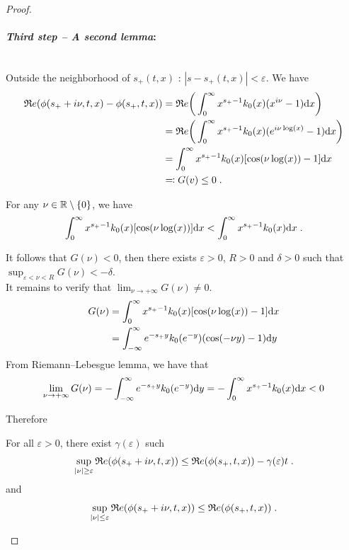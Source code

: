 \documentclass[11pt]{amsart}
\renewcommand{\Re}{\mathfrak{R}e}
\begin{document}
\begin{proof}
\medskip
\paragraph{\textit{Third step -- A second lemma}:}\mbox{}\\
Outside the neighborhood of $s_+(t,x)$ : $|s - s_+(t,x)| < \varepsilon$. We have
\begin{align*}
    \Re(\phi(s_+ + i \nu, t, x) - \phi(s_+, t, x)) 
    &=
    \Re \bigg( \int_0^\infty x^{s_+ - 1}k_0(x) (x^{i\nu} - 1) \dx \bigg) \\
    &=
    \Re \bigg( \int_0^\infty x^{s_+ - 1}k_0(x) (e^{i\nu \log(x)}- 1) \dx \bigg) \\ 
    &= 
    \int_0^\infty x^{s_+ - 1}k_0(x) [\cos(\nu \log(x))- 1] \dx  \\
    &\eqqcolon G(v) \leq 0
    \eqfinp
\end{align*}

For any $\nu \in \mathbb{R} \setminus \{0\}$, we have
\begin{equation}
 \int_0^\infty x^{s_+ - 1}k_0(x) [\cos(\nu \log(x))] \mathrm dx < \int_0^\infty x^{s_+ - 1}k_0(x) \mathrm dx
 \; .
\end{equation}

It follows that $G(\nu) < 0$, then there exists $\varepsilon > 0$, $R >0$ and $\delta > 0$
such that $\sup_{\varepsilon < \nu < R}G(\nu) < - \delta$.\\

It remains to verify that $\lim_{\nu \to +\infty}G(\nu) \neq 0$. 
\begin{align*}
    G(\nu) 
    &=  \int_0^\infty x^{s_+ - 1}k_0(x) [\cos(\nu \log(x))- 1] \mathrm dx \\
    &=  \int_{-\infty}^\infty e^{-s_+ y}k_0(e^{-y})(\cos(-\nu y) - 1 )\mathrm dy
    \end{align*}
From Riemann–Lebesgue lemma, we have that 
\begin{equation}
    \lim_{\nu \to +\infty}G(\nu) = - \int_{-\infty}^\infty e^{-s_+ y}k_0(e^{-y})\mathrm dy = - \int_{0}^\infty x^{s_+ - 1}k_0(x)\mathrm dx < 0
\end{equation}

Therefore
\begin{lemma} For all $\varepsilon > 0$, there exist $\gamma(\varepsilon)$ such
\begin{equation}
    \sup_{|\nu| \geq \varepsilon } \Re(\phi(s_+ + i \nu, t, x)) \leq \Re(\phi(s_+, t, x)) - \gamma(\varepsilon)t
    \eqfinp
\end{equation}
and
\begin{equation}
    \sup_{|\nu| \leq \varepsilon } \Re(\phi(s_+ + i \nu, t, x)) \leq \Re(\phi(s_+, t, x))
    \eqfinp
\end{equation}
\end{lemma}


\end{proof}
\end{document}
